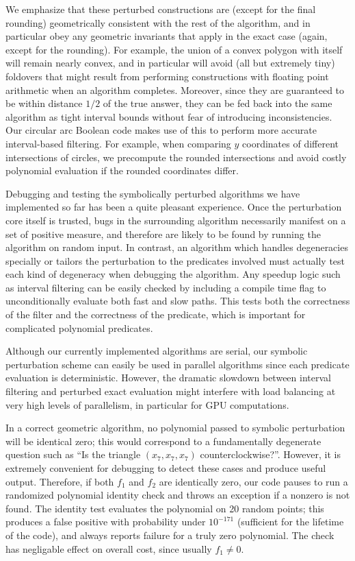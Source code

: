 \documentclass[11pt]{article}
\begin{document}
We emphasize that these perturbed constructions are (except for the final rounding) geometrically consistent with the rest of the algorithm, and in particular obey any geometric
invariants that apply in the exact case (again, except for the rounding).  For example, the union of a convex polygon with itself will remain nearly convex, and in particular will
avoid (all but extremely tiny) foldovers that might result from performing constructions with floating point arithmetic when an algorithm completes.  Moreover, since they
are guaranteed to be within distance $1/2$ of the true answer, they can be fed back into the same algorithm as tight interval bounds without fear of introducing inconsistencies.  Our
circular arc Boolean code makes use of this to perform more accurate interval-based filtering.  For example, when comparing $y$ coordinates of different intersections of circles,
we precompute the rounded intersections and avoid costly polynomial evaluation if the rounded coordinates differ.

Debugging and testing the symbolically perturbed algorithms we have implemented so far has been a quite pleasant experience.  Once the perturbation core itself is trusted,
bugs in the surrounding algorithm necessarily manifest on a set of positive measure, and therefore are likely to be found by running the algorithm on random input.  In contrast, an
algorithm which handles degeneracies specially or tailors the perturbation to the predicates involved must actually test each kind of degeneracy when debugging the algorithm.
Any speedup logic such as interval filtering can be easily checked by including a compile time flag to unconditionally evaluate both fast and slow paths.  This tests both the
correctness of the filter and the correctness of the predicate, which is important for complicated polynomial predicates.

Although our currently implemented algorithms are serial, our symbolic perturbation scheme can easily be used in parallel algorithms since each predicate evaluation is deterministic.
However, the dramatic slowdown between interval filtering and perturbed exact evaluation might interfere with load balancing at very high levels of parallelism, in particular for
GPU computations.

In a correct geometric algorithm, no polynomial passed to symbolic perturbation will be identical zero; this would correspond to a fundamentally degenerate question such as
``Is the triangle $(x_7,x_7,x_7)$ counterclockwise?''.  However, it is extremely convenient for debugging to detect these cases and produce useful output.  Therefore,
if both $f_1$ and $f_2$ are identically zero, our code pauses to run a randomized polynomial identity check \cite{schwartz1980fast} and throws an exception if a nonzero is not found.
The identity test evaluates the polynomial on 20 random points; this produces a false positive with probability under $10^{-171}$ (sufficient for the
lifetime of the code), and always reports failure for a truly zero polynomial.  The check has negligable effect on overall cost, since usually $f_1 \ne 0$.
\end{document}
